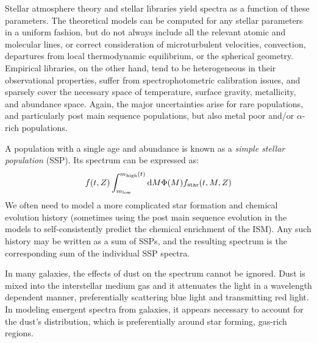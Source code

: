 Stellar atmosphere theory and stellar libraries yield spectra as a
function of these parameters. The theoretical models can be computed
for any stellar parameters in a uniform fashion, but do not always
include all the relevant atomic and molecular lines, or correct
consideration of microturbulent velocities, convection, departures
from local thermodynamic equilibrium, or the spherical
geometry. Empirical libraries, on the other hand, tend to be
heterogeneous in their observational properties, suffer from
spectrophotometric calibration issues, and sparsely cover the
necessary space of temperature, surface gravity, metallicity, and
abundance space.  Again, the major uncertainties arise for rare
populations, and particularly post main sequence populations, but also
metal poor and/or $\alpha$-rich populations.

A population with a single age and abundance is known as a {\it simple
stellar population} (SSP). Its spectrum can be expressed as:
\begin{equation}
f(t, Z) \int_{m_{\rm low}}^{m_{\rm high}(t)} {\rm d}M \Phi(M) f_{\rm
star}(t, M, Z)
\end{equation}
We often need to model a more complicated star formation and chemical
evolution history (sometimes using the post main sequence evolution in
the models to self-consistently predict the chemical enrichment of the
ISM). Any such history may be written as a sum of SSPs, and the
resulting spectrum is the corresponding sum of the individual SSP
spectra.

In many galaxies, the effects of dust on the spectrum cannot be
ignored. Dust is mixed into the interstellar medium gas and it
attenuates the light in a wavelength dependent manner, preferentially
scattering blue light and transmitting red light. In modeling emergent
spectra from galaxies, it appears necessary to account for the dust's
distribution, which is preferentially around star forming, gas-rich
regions. 

